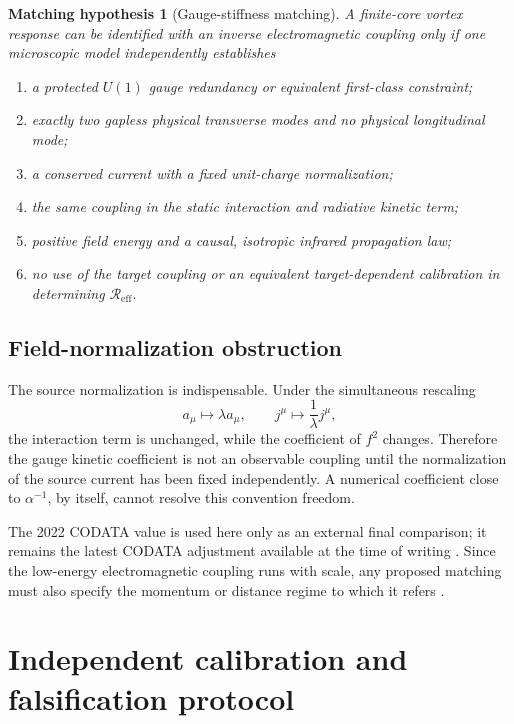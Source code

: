 \documentclass[aps,pre,preprint,notitlepage,nofootinbib,superscriptaddress]{revtex4-2}
\newcommand{\Reff}{\mathscr R_{\mathrm{eff}}}
\newtheorem{hypothesis}{Matching hypothesis}
\begin{document}
\begin{hypothesis}[Gauge-stiffness matching]
A finite-core vortex response can be identified with an inverse electromagnetic coupling only if one microscopic model independently establishes
\begin{enumerate}[label=(\alph*)]
  \item a protected $U(1)$ gauge redundancy or equivalent first-class constraint;
  \item exactly two gapless physical transverse modes and no physical longitudinal mode;
  \item a conserved current with a fixed unit-charge normalization;
  \item the same coupling in the static interaction and radiative kinetic term;
  \item positive field energy and a causal, isotropic infrared propagation law;
  \item no use of the target coupling or an equivalent target-dependent calibration in determining $\Reff$.
\end{enumerate}
\end{hypothesis}

\subsection{Field-normalization obstruction}

The source normalization is indispensable.  Under the simultaneous rescaling
\begin{equation}
  a_\mu\mapsto\lambda a_\mu,
  \qquad
  j^\mu\mapsto\frac{1}{\lambda}j^\mu,
\end{equation}
the interaction term is unchanged, while the coefficient of $f^2$ changes.  Therefore the gauge kinetic coefficient is not an observable coupling until the normalization of the source current has been fixed independently.  A numerical coefficient close to $\alpha^{-1}$, by itself, cannot resolve this convention freedom.

The 2022 CODATA value is used here only as an external final comparison; it remains the latest CODATA adjustment available at the time of writing \cite{TiesingaEtAl2024}.  Since the low-energy electromagnetic coupling runs with scale, any proposed matching must also specify the momentum or distance regime to which it refers \cite{PeskinSchroeder1995}.

\section{Independent calibration and falsification protocol}
\label{sec:calibration}
\end{document}
